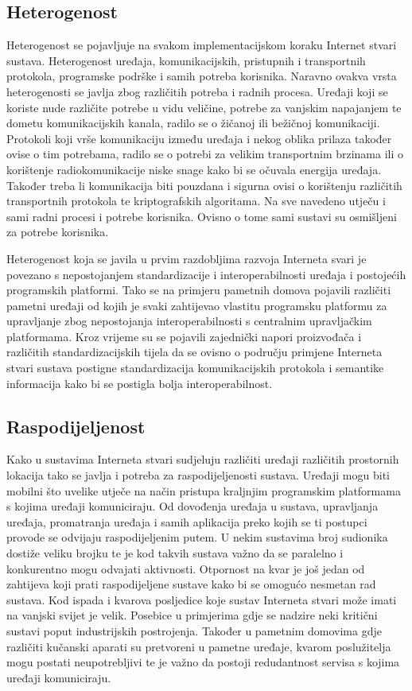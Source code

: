 \documentclass[times, utf8, diplomski]{fer}
\begin{document}
\subsection{Heterogenost}
Heterogenost se pojavljuje na svakom implementacijskom koraku Internet stvari sustava. Heterogenost uređaja, komunikacijskih, pristupnih i transportnih protokola, programske podrške i samih potreba korisnika. Naravno ovakva vrsta heterogenosti se javlja zbog različitih potreba i radnih procesa. Uređaji koji se koriste nude različite potrebe u vidu veličine, potrebe za vanjskim napajanjem te dometu komunikacijskih kanala, radilo se o žičanoj ili bežičnoj komunikaciji. Protokoli koji vrše komunikaciju između uređaja i nekog oblika prilaza također ovise o tim potrebama, radilo se o potrebi za velikim transportnim brzinama ili o korištenje radiokomunikacije niske snage kako bi se očuvala energija uređaja. Također treba li komunikacija biti pouzdana i sigurna ovisi o korištenju različitih transportnih protokola te kriptografskih algoritama. Na sve navedeno utječu i sami radni procesi i potrebe korisnika. Ovisno o tome sami sustavi su osmišljeni za potrebe korisnika.

Heterogenost koja se javila u prvim razdobljima razvoja Interneta svari je povezano s nepostojanjem standardizacije i interoperabilnosti uređaja i postojećih programskih platformi. Tako se na primjeru pametnih domova pojavili različiti pametni uređaji od kojih je svaki zahtijevao vlastitu programsku platformu za upravljanje zbog nepostojanja interoperabilnosti s centralnim upravljačkim platformama. Kroz vrijeme su se pojavili zajednički napori proizvođača i različitih standardizacijskih tijela da se ovisno o području primjene Interneta stvari sustava postigne standardizacija komunikacijskih protokola i semantike informacija kako bi se postigla bolja interoperabilnost.

\subsection{Raspodijeljenost}
Kako u sustavima Interneta stvari sudjeluju različiti uređaji različitih prostornih lokacija tako se javlja i potreba za raspodijeljenosti sustava. Uređaji mogu biti mobilni što uvelike utječe na način pristupa kraljnjim programskim platformama s kojima uređaji komuniciraju. Od dovođenja uređaja u sustava, upravljanja uređaja, promatranja uređaja i samih aplikacija preko kojih se ti postupci provode se odvijaju raspodijeljenim putem. U nekim sustavima broj sudionika dostiže veliku brojku te je kod takvih sustava važno da se paralelno i konkurentno mogu odvajati aktivnosti. Otpornost na kvar je još jedan od zahtijeva koji prati raspodijeljene sustave kako bi se omogućo nesmetan rad sustava. Kod ispada i kvarova posljedice koje sustav Interneta stvari može imati na vanjski svijet je velik. Posebice u primjerima gdje se nadzire neki kritični sustavi poput industrijskih postrojenja. Također u pametnim domovima gdje različiti kučanski aparati su pretvoreni u pametne uređaje, kvarom poslužitelja mogu postati neupotrebljivi te je važno da postoji redudantnost servisa s kojima uređaji komuniciraju.
\end{document}
